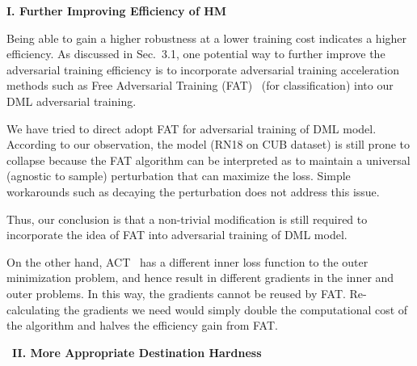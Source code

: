 \noindent\textbf{I. Further Improving Efficiency of HM}

Being able to gain a higher robustness at a lower training cost indicates a
higher efficiency.
%
As discussed in Sec.~3.1, one potential way to further improve the adversarial
training efficiency is to incorporate adversarial training acceleration methods
such as Free Adversarial Training (FAT)~\cite{freeat} (for classification) into
our DML adversarial training.

We have tried to direct adopt FAT for adversarial training of DML model.
%
According to our observation, the model (RN18 on CUB dataset) is still prone
to collapse because the FAT algorithm can be interpreted as to maintain
a universal (agnostic to sample) perturbation that can maximize the loss.
%
Simple workarounds such as decaying the perturbation does not address this
issue.

Thus, our conclusion is that a non-trivial modification is still required
to incorporate the idea of FAT into adversarial training of DML model.

On the other hand, ACT~\cite{robrank} has a different inner loss function to
the outer minimization problem, and hence result in different gradients in the
inner and outer problems.
%
In this way, the gradients cannot be reused by FAT.
%
Re-calculating the gradients we need would simply double the
computational cost of the algorithm and halves the efficiency gain from FAT.

\begin{comment}
FAT works on toy dataset only for adversarial DML.

Further experiments suggest very weak robustness and the
models are very prone to collapse due to the non-zero initial delta
(results in too hard adversarial example).

Gradient approximation does not work. Triplet gradient and ACT
gradient are convertible.

Does the new generic HM work under FAT?
	Previous FAT leads to collapse because (even if in the amdsemi +fat
	experiment due to implementation issue) the delta is going to be universal
	so that for every input $x$ it will increase $H[L(x)]$ as much as possible.
	This is too prone to lead to collpase. Can we reuse the gradient for 
	Hardness Manipulation then? We linearly scale down the delta?
	We want to minimize $E[|H_{src}(x)-H_{dst}(x)|]$ (to a specified hardness).
\end{comment}

~\newline\textbf{II. More Appropriate Destination Hardness}

